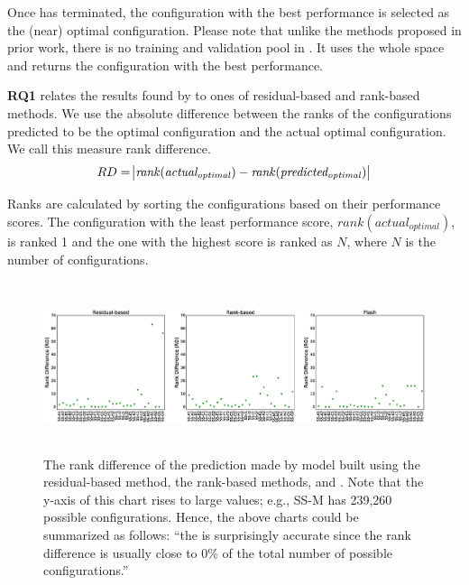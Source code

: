 Once \flash has terminated, the configuration with the best performance is selected as the (near) optimal configuration. Please note that unlike the methods proposed in prior work, there is no training and validation pool in \flash. It uses the whole space and returns the configuration with the best performance. 



\textbf{RQ1} relates the results found by \flash to ones of residual-based and rank-based methods. We use the absolute difference between the ranks of the configurations predicted to be the optimal configuration and the actual optimal configuration. We call this measure rank difference.
\begin{equation}\label{eq:rankdiff_flash}
    \begin{split}
        RD &= \abs{\mathit{rank(actual_{optimal})} - \mathit{rank(predicted_{optimal})}}\\
    \end{split}
\end{equation}



\noindent Ranks are calculated by sorting the configurations based on their performance scores. The configuration with the least performance score, $\mathit{rank(actual_{optimal})}$, is ranked 1 and the one with the highest score is ranked as $N$, where $N$ is the number of configurations.



\begin{figure}[t]
\centering
\includegraphics[width=0.75\paperwidth, height=5cm]{Chapter-Flash/figures/one_obj_rd.eps}
\caption[The rank difference of the prediction made by model built using the residual-based method, the rank-based methods, and \flash.]{
    \small{The rank difference of the prediction made by model built using the residual-based method, the rank-based methods, and \flash. Note that the y-axis of this chart rises to large values; e.g., SS-M has 239,260 possible configurations. Hence, the above charts could be summarized as follows: ``the \flash is surprisingly accurate since the rank difference is usually close to 0\% of the total number of possible configurations.'' 
    }
}\label{fig:one_obj_rd}
\end{figure}

